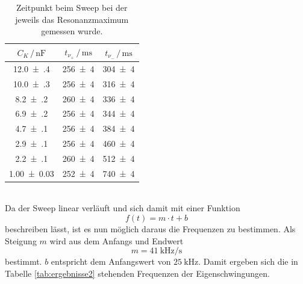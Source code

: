 \documentclass[
  bibliography=totoc,     %
  captions=tableheading,  %
  titlepage=firstiscover, %
]{scrartcl}
\begin{document}
\begin{table}
  \centering
  \caption{Zeitpunkt beim Sweep bei der jeweils das Resonanzmaximum gemessen wurde.}
  \label{tab:messwerte2}
  \begin{tabular}{S S S}
    \toprule
    {$C_K \,/\, \si{\nano\farad}$} & {$t_{\nu_+} \,/\, \si{\milli\second}$} & {$t_{\nu_-} \,/\, \si{\milli\second}$}\\
    \midrule
    \num{12.0(4)} & \num{256(4)} & \num{304(4)}\\
    \num{10.0(3)} & \num{256(4)} & \num{316(4)}\\
    \num{8.2(2)} & \num{260(4)} & \num{336(4)}\\
    \num{6.9(2)} & \num{256(4)} & \num{344(4)}\\
    \num{4.7(1)} & \num{256(4)} & \num{384(4)}\\
    \num{2.9(1)} & \num{256(4)} & \num{460(4)}\\
    \num{2.2(1)} & \num{260(4)} & \num{512(4)}\\
    \num{1.00(3)} & \num{252(4)} & \num{740(4)}\\
    \bottomrule
  \end{tabular}
\end{table}\\
Da der Sweep linear verläuft und sich damit mit einer Funktion
\begin{equation}
  f(t)=m \cdot t + b
\end{equation}
beschreiben lässt, ist es nun möglich daraus die Frequenzen zu bestimmen.
Als Steigung $m$ wird aus dem Anfangs und Endwert
\begin{equation}
  m = \SI{41}{\kilo\hertz\per\second}
\end{equation}
bestimmt.
$b$ entspricht dem Anfangswert von $\SI{25}{\kilo\hertz}$.
Damit ergeben sich die in Tabelle \ref{tab:ergebnisse2} stehenden Frequenzen der
Eigenschwingungen.
\end{document}
